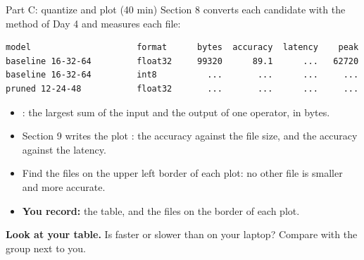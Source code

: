 \begin{frame}[fragile]{Part C: quantize and plot (40 min)}
  \small
  Section 8 converts each candidate with the method of Day 4 and measures
  each file:
\begin{lstlisting}
model                     format      bytes  accuracy  latency    peak
baseline 16-32-64         float32     99320      89.1      ...   62720
baseline 16-32-64         int8          ...       ...      ...     ...
pruned 12-24-48           float32       ...       ...      ...     ...
\end{lstlisting}
  \begin{itemize}
    \item {}: the largest sum of the input and the output of one
          operator, in bytes.
    \item Section 9 writes the plot : the accuracy
          against the file size, and the accuracy against the latency.
    \item Find the files on the upper left border of each plot: no other
          file is smaller and more accurate.
    \item \textbf{You record:} the table, and the files on the border of
          each plot.
  \end{itemize}
  \begin{exerciseblock}
    \textbf{Look at your table.} Is  faster or slower than
     on your laptop? Compare with the group next to you.
  \end{exerciseblock}
\end{frame}

